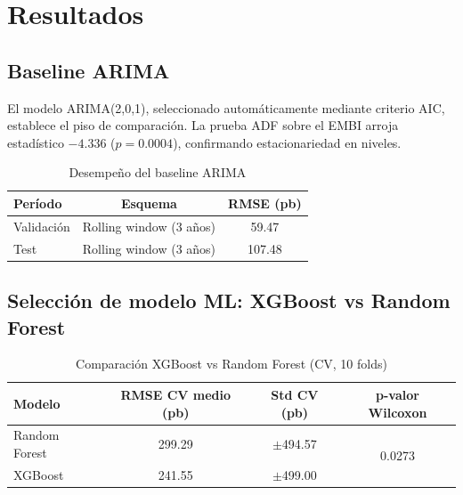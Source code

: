 \chapter{Resultados}

\section{Baseline ARIMA}

El modelo ARIMA(2,0,1), seleccionado automáticamente mediante criterio AIC, establece el piso de comparación.
La prueba ADF sobre el EMBI arroja estadístico $-4.336$ ($p = 0.0004$), confirmando estacionariedad en niveles.

\begin{table}[H]
\centering
\caption{Desempeño del baseline ARIMA}
\label{tab:arima}
\begin{tabular}{lcc}
\toprule
\textbf{Período} & \textbf{Esquema} & \textbf{RMSE (pb)} \\
\midrule
Validación & Rolling window (3 años) & 59.47 \\
Test        & Rolling window (3 años) & 107.48 \\
\bottomrule
\end{tabular}
\end{table}


\section{Selección de modelo ML: XGBoost vs Random Forest}

\begin{table}[H]
\centering
\caption{Comparación XGBoost vs Random Forest (CV, 10 folds)}
\label{tab:cv_comparison}
\begin{tabular}{lccc}
\toprule
\textbf{Modelo} & \textbf{RMSE CV medio (pb)} & \textbf{Std CV (pb)} & \textbf{p-valor Wilcoxon} \\
\midrule
Random Forest & 299.29 & $\pm$494.57 & \multirow{2}{*}{0.0273} \\
XGBoost       & 241.55 & $\pm$499.00 & \\
\bottomrule
\end{tabular}
\end{table}


